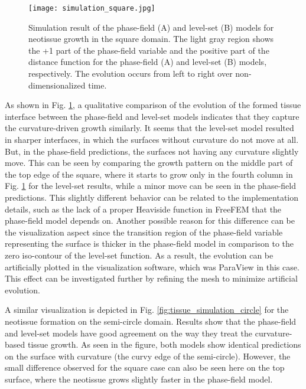 \begin{figure}
\centering
\medskip
\texttt{[image: simulation\_square.jpg]}
\caption[Simulation result of neotissue growth in the square domain]{Simulation result of the phase-field (A) and level-set (B) models for neotissue growth in the square domain. The light gray region shows the +1 part of the phase-field variable and the positive part of the distance function for the phase-field (A) and level-set (B) models, respectively. The evolution occurs from left to right over non-dimensionalized time.}
\label{fig:tissue_simulation_square}
\end{figure}

As shown in Fig. \ref{fig:tissue_simulation_square}, a qualitative comparison of the evolution of the formed tissue interface between the phase-field and level-set models indicates that they capture the curvature-driven growth similarly. It seems that the level-set model resulted in sharper interfaces, in which the surfaces without curvature do not move at all. But, in the phase-field predictions, the surfaces not having any curvature slightly move. This can be seen by comparing the growth pattern on the middle part of the top edge of the square, where it starts to grow only in the fourth column in Fig. \ref{fig:tissue_simulation_square} for the level-set results, while a minor move can be seen in the phase-field predictions. This slightly different behavior can be related to the implementation details, such as the lack of a proper Heaviside function in FreeFEM that the phase-field model depends on. Another possible reason for this difference can be the visualization aspect since the transition region of the phase-field variable representing the surface is thicker in the phase-field model in comparison to the zero iso-contour of the level-set function. As a result, the evolution can be artificially plotted in the visualization software, which was ParaView in this case. This effect can be investigated further by refining the mesh to minimize artificial evolution.

A similar visualization is depicted in Fig. \ref{fig:tissue_simulation_circle} for the neotissue formation on the semi-circle domain. Results show that the phase-field and level-set models have good agreement on the way they treat the curvature-based tissue growth. As seen in the figure, both models show identical predictions on the surface with curvature (the curvy edge of the semi-circle). However, the small difference observed for the square case can also be seen here on the top surface, where the neotissue grows slightly faster in the phase-field model.

